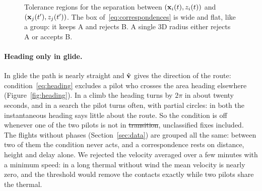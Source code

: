 \begin{figure}
\centering
{}
\caption{Tolerance regions for the separation between $(\mathbf{x}_i(t),z_i(t))$ and $(\mathbf{x}_j(t'),z_j(t'))$.
The box of~\eqref{eq:correspondences} is wide and flat, like a group: it keeps A and rejects B.
A single 3D radius either rejects A or accepts B.}
\label{fig:isotropic}
\end{figure}

\paragraph{Heading only in glide.} In glide the path is nearly straight and $\hat{\mathbf{v}}$ gives the
direction of the route: condition~\eqref{eq:heading} excludes a pilot who crosses the area heading
elsewhere (Figure~\ref{fig:heading}). In a climb the heading turns by $2\pi$ in about twenty
seconds, and in a search the pilot turns often, with partial circles: in both the instantaneous
heading says little about the route. So the condition is off whenever one of the two pilots is not
in \st{transition}, unclassified fixes included. The flights without phases
(Section~\ref{sec:data}) are grouped all the same: between two of them the condition never acts,
and a correspondence rests on distance, height and delay alone. We rejected the velocity averaged over a few
minutes with a minimum speed: in a long thermal without wind the mean velocity is nearly zero, and
the threshold would remove the contacts exactly while two pilots share the thermal.

